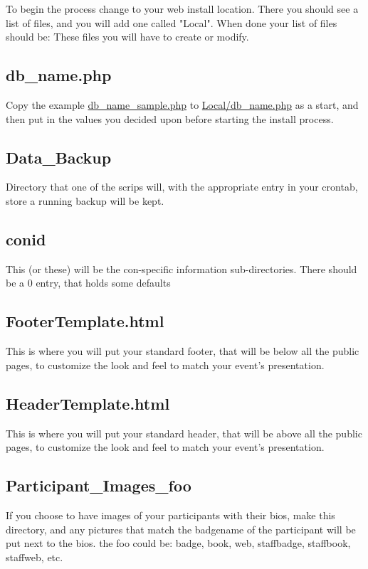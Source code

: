\documentclass[captions=tablesignature]{scrartcl}
\begin{document}
To begin the process change to your web install location.  There you
should see a list of files, and you will add one called "Local".
When done your list of files should be:
These files you will have to create or modify.
\subsection{db\_name.php}
\label{sec-3-1}
Copy the example \href{../webpages/db_name_sample.php}{db\_name\_sample.php} to \href{../Local/db_name.php}{Local/db\_name.php}
as a start, and then put in the values you decided upon before
starting the install process.

\subsection{Data\_Backup}
\label{sec-3-2}
Directory that one of the scrips will, with the appropriate entry
in your crontab, store a running backup will be kept.

\subsection{conid}
\label{sec-3-3}
This (or these) will be the con-specific information
sub-directories.
There should be a 0 entry, that holds some defaults

\subsection{FooterTemplate.html}
\label{sec-3-4}
This is where you will put your standard footer, that will be
below all the public pages, to customize the look and feel to
match your event's presentation.

\subsection{HeaderTemplate.html}
\label{sec-3-5}
This is where you will put your standard header, that will be
above all the public pages, to customize the look and feel to
match your event's presentation.

\subsection{Participant\_Images\_foo}
\label{sec-3-6}
If you choose to have images of your participants with their
bios, make this directory, and any pictures that match the
badgename of the participant will be put next to the bios.
the foo could be: badge, book, web, staffbadge, staffbook,
staffweb, etc.
\end{document}
